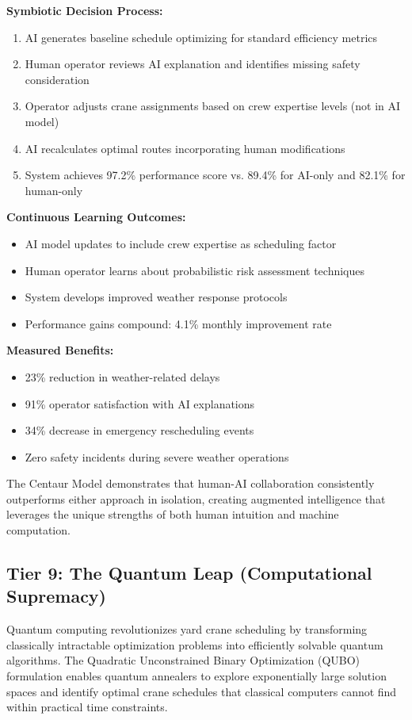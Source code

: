 \documentclass{article}
\begin{document}
\textbf{Symbiotic Decision Process:}
\begin{enumerate}
\item AI generates baseline schedule optimizing for standard efficiency metrics
\item Human operator reviews AI explanation and identifies missing safety consideration
\item Operator adjusts crane assignments based on crew expertise levels (not in AI model)
\item AI recalculates optimal routes incorporating human modifications
\item System achieves 97.2\% performance score vs. 89.4\% for AI-only and 82.1\% for human-only
\end{enumerate}

\textbf{Continuous Learning Outcomes:}
\begin{itemize}
\item AI model updates to include crew expertise as scheduling factor
\item Human operator learns about probabilistic risk assessment techniques
\item System develops improved weather response protocols
\item Performance gains compound: 4.1\% monthly improvement rate
\end{itemize}

\textbf{Measured Benefits:}
\begin{itemize}
\item 23\% reduction in weather-related delays
\item 91\% operator satisfaction with AI explanations
\item 34\% decrease in emergency rescheduling events
\item Zero safety incidents during severe weather operations
\end{itemize}

The Centaur Model demonstrates that human-AI collaboration consistently outperforms either approach in isolation, creating augmented intelligence that leverages the unique strengths of both human intuition and machine computation.

\subsection{Tier 9: The Quantum Leap (Computational Supremacy)}

Quantum computing revolutionizes yard crane scheduling by transforming classically intractable optimization problems into efficiently solvable quantum algorithms. The Quadratic Unconstrained Binary Optimization (QUBO) formulation enables quantum annealers to explore exponentially large solution spaces and identify optimal crane schedules that classical computers cannot find within practical time constraints.
\end{document}
